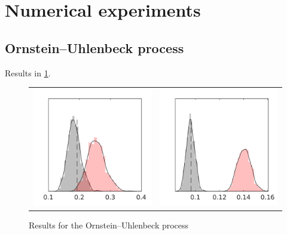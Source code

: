 \documentclass[10pt]{article}
\begin{document}
\section{Numerical experiments}

\subsection{Ornstein--Uhlenbeck process}

Results in \ref{fig:A_OU}.

\begin{figure}
	\centering 
	\begin{tabular}{cc}
	\includegraphics[]{Figures/A_OU.png} & 	\includegraphics[]{Figures/S_OU.png}
	\end{tabular}
	\caption{Results for the Ornstein--Uhlenbeck process}
	\label{fig:A_OU}
\end{figure}
\end{document}
